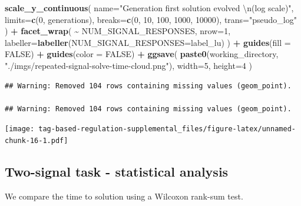 \documentclass[
]{book}
\newenvironment{Shaded}{\begin{snugshade}}{\end{snugshade}}
\newcommand{\CharTok}[1]{\textcolor[rgb]{0.31,0.60,0.02}{#1}}
\newcommand{\DataTypeTok}[1]{\textcolor[rgb]{0.13,0.29,0.53}{#1}}
\newcommand{\DecValTok}[1]{\textcolor[rgb]{0.00,0.00,0.81}{#1}}
\newcommand{\KeywordTok}[1]{\textcolor[rgb]{0.13,0.29,0.53}{\textbf{#1}}}
\newcommand{\NormalTok}[1]{#1}
\newcommand{\OperatorTok}[1]{\textcolor[rgb]{0.81,0.36,0.00}{\textbf{#1}}}
\newcommand{\OtherTok}[1]{\textcolor[rgb]{0.56,0.35,0.01}{#1}}
\newcommand{\StringTok}[1]{\textcolor[rgb]{0.31,0.60,0.02}{#1}}
\begin{document}
\begin{Shaded}
\begin{Highlighting}[]
\StringTok{  }\KeywordTok{scale\_y\_continuous}\NormalTok{(}
    \DataTypeTok{name=}\StringTok{"Generation first solution evolved }\CharTok{\textbackslash{}n}\StringTok{(log scale)"}\NormalTok{,}
    \DataTypeTok{limits=}\KeywordTok{c}\NormalTok{(}\DecValTok{0}\NormalTok{, generations),}
    \DataTypeTok{breaks=}\KeywordTok{c}\NormalTok{(}\DecValTok{0}\NormalTok{, }\DecValTok{10}\NormalTok{, }\DecValTok{100}\NormalTok{, }\DecValTok{1000}\NormalTok{, }\DecValTok{10000}\NormalTok{),}
    \DataTypeTok{trans=}\StringTok{"pseudo\_log"}
\NormalTok{  ) }\OperatorTok{+}
\StringTok{  }\KeywordTok{facet\_wrap}\NormalTok{(}
    \OperatorTok{\textasciitilde{}}\StringTok{ }\NormalTok{NUM\_SIGNAL\_RESPONSES,}
    \DataTypeTok{nrow=}\DecValTok{1}\NormalTok{,}
    \DataTypeTok{labeller=}\KeywordTok{labeller}\NormalTok{(}\DataTypeTok{NUM\_SIGNAL\_RESPONSES=}\NormalTok{label\_lu)}
\NormalTok{  ) }\OperatorTok{+}
\StringTok{  }\KeywordTok{guides}\NormalTok{(}\DataTypeTok{fill =} \OtherTok{FALSE}\NormalTok{) }\OperatorTok{+}
\StringTok{  }\KeywordTok{guides}\NormalTok{(}\DataTypeTok{color =} \OtherTok{FALSE}\NormalTok{) }\OperatorTok{+}
\StringTok{  }\KeywordTok{ggsave}\NormalTok{(}
    \KeywordTok{paste0}\NormalTok{(working\_directory, }\StringTok{"./imgs/repeated{-}signal{-}solve{-}time{-}cloud.png"}\NormalTok{),}
    \DataTypeTok{width=}\DecValTok{5}\NormalTok{,}
    \DataTypeTok{height=}\DecValTok{4}
\NormalTok{  )}
\end{Highlighting}
\end{Shaded}

\begin{verbatim}
## Warning: Removed 104 rows containing missing values (geom_point).

## Warning: Removed 104 rows containing missing values (geom_point).
\end{verbatim}

\texttt{[image: tag-based-regulation-supplemental\_files/figure-latex/unnamed-chunk-16-1.pdf]}

\hypertarget{two-signal-task---statistical-analysis}{%
\subsection{Two-signal task - statistical analysis}\label{two-signal-task---statistical-analysis}}

We compare the time to solution using a Wilcoxon rank-sum test.
\end{document}
